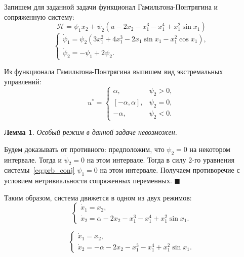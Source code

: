 \documentclass[12pt, a4paper]{article} %
\newtheorem{Lem}{Лемма}
\newenvironment{Proof}{\par\noindent{\bf Доказательство.}}{\hfill$\scriptstyle\blacksquare$}
\begin{document}
Запишем для заданной задачи функционал Гамильтона-Понтрягина и сопряженную систему:
\begin{equation}\label{eq:prb_ham}
    \mathcal{H} = \psi_1 x_2 + \psi_2 \left( u - 2x_2 -x_1^3 - x_1^{4} + x_1^2 \sin x_1 \right)
\end{equation} 
\begin{equation}\label{eq:prb_conj}
    \begin{cases}
        \dot \psi_1 = \psi_2 \left( 3x_1^2 + 4x_1^3 - 2x_1\sin x_1 - 
            x_1^2\cos x_1\right), \\
        \dot \psi_2 = -\psi_1 + 2\psi_2. 
    \end{cases} 
\end{equation} 

Из функционала Гамильтона-Понтрягина выпишем вид экстремальных управлений:
\begin{equation}\label{prb_controls}
    u^* = 
    \begin{cases}
        \alpha, & \psi_2 > 0, \\
        [-\alpha, \alpha], & \psi_2 = 0, \\
        -\alpha, & \psi_2 < 0.
    \end{cases} 
\end{equation} 

\begin{Lem}
    Особый режим в данной задаче невозможен.
\end{Lem} 
\begin{Proof}
    Будем доказывать от противного: предположим, что $\psi_2 = 0$ на некотором интервале.
    Тогда и $\dot \psi_2 = 0$ на этом интервале.
    Тогда в силу 2-го уравнения системы~\eqref{eq:prb_conj} $\psi_1 = 0$ на этом интервале. 
    Получаем противоречие с условием нетривиальности сопряженных переменных.
\end{Proof} 

Таким образом, система движется в одном из двух режимов:
\begin{equation}\label{prb_pos}\tag{$+$}
    \begin{cases}
        \dot x_1 = x_2, \\
        \dot x_2 = \alpha - 2x_2 -x_1^3 - x_1^{4} + x_1^2 \sin x_1.
    \end{cases}
\end{equation} 

\begin{equation}\label{prb_neg}\tag{$-$}
    \begin{cases}
        \dot x_1 = x_2, \\
        \dot x_2 = -\alpha - 2x_2 -x_1^3 - x_1^{4} + x_1^2 \sin x_1.
    \end{cases}
\end{equation} 




 
\end{document}

